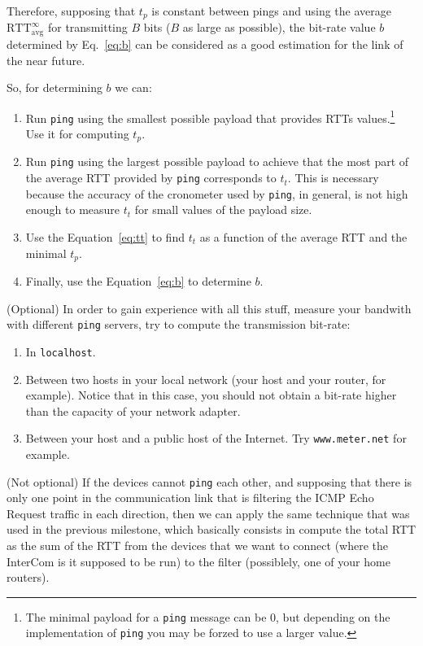 Therefore, supposing that $t_p$ is constant between pings and using
the average $\text{RTT}_{\text{avg}}^\infty$ for transmitting $B$ bits ($B$
as large as possible), the bit-rate value $b$ determined by
Eq.~\ref{eq:b} can be considered as a good estimation for the link of
the near future.

So, for determining $b$ we can:
\begin{enumerate}
\item Run \texttt{ping} using the smallest possible payload that
  provides RTTs values.\footnote{The minimal payload for a
    \texttt{ping} message can be 0, but depending on the
    implementation of \texttt{ping} you may be forzed to use a larger
    value.} Use it for computing $t_p$.
  
\item Run \texttt{ping} using the largest possible payload to achieve
  that the most part of the average RTT provided by \texttt{ping}
  corresponds to $t_t$. This is necessary because the accuracy of the
  cronometer used by \texttt{ping}, in general, is not high enough to
  measure $t_t$ for small values of the payload size.
  
\item Use the Equation~\ref{eq:tt} to find $t_t$ as a function of
  the average RTT and the minimal $t_p$.
  
\item Finally, use the Equation~\ref{eq:b} to determine $b$.
\end{enumerate}

(Optional) In order to gain experience with all this stuff, measure
your bandwith with different \texttt{ping} servers, try to compute the
transmission bit-rate:
\begin{enumerate}
\item In \texttt{localhost}.
\item Between two hosts in your local network (your host and your
  router, for example). Notice that in this case, you should not
  obtain a bit-rate higher than the capacity of your network adapter.
\item Between your host and a public host of the Internet. Try
  \texttt{www.meter.net} for example.
\end{enumerate}

(Not optional) If the devices cannot \texttt{ping} each other, and
supposing that there is only one point in the communication link that
is filtering the ICMP Echo Request traffic in each direction, then we
can apply the same technique that was used in the previous milestone,
which basically consists in compute the total RTT as the sum of the
RTT from the devices that we want to connect (where the InterCom is it
supposed to be run) to the filter (possiblely, one of your home
routers).


